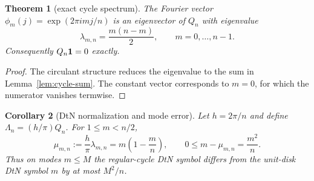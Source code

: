 \documentclass[10pt,leqno]{article}
\numberwithin{equation}{section}
\theoremstyle{plain}
\newtheorem{theorem}{Theorem}[section]
\newtheorem{corollary}[theorem]{Corollary}
\theoremstyle{definition}
\theoremstyle{remark}
\newcommand{\Qop}{Q}
\newcommand{\Lam}{\Lambda}
\begin{document}
\begin{theorem}[exact cycle spectrum]\label{thm:cycle-spectrum}
The Fourier vector $\phi_m(j)=\exp(2\pi i m j/n)$ is an eigenvector of $\Qop_n$ with eigenvalue
\begin{equation}
\lambda_{m,n}=\frac{m(n-m)}{2},\qquad m=0,\ldots,n-1.
\end{equation}
Consequently $\Qop_n{\bf 1}=0$ exactly.
\end{theorem}
\begin{proof}
The circulant structure reduces the eigenvalue to the sum in Lemma~\ref{lem:cycle-sum}.  The constant vector corresponds to $m=0$, for which the numerator vanishes termwise.
\end{proof}

\begin{corollary}[DtN normalization and mode error]\label{cor:dtn-symbol}
Let $h=2\pi/n$ and define $\Lam_n=(h/\pi)\Qop_n$.  For $1\le m<n/2$,
\begin{equation}
\mu_{m,n}:=\frac{h}{\pi}\lambda_{m,n}=m\left(1-\frac{m}{n}\right),
\qquad
0\le m-\mu_{m,n}=\frac{m^2}{n}.
\end{equation}
Thus on modes $m\le M$ the regular-cycle DtN symbol differs from the unit-disk DtN symbol $m$ by at most $M^2/n$.
\end{corollary}
\end{document}
